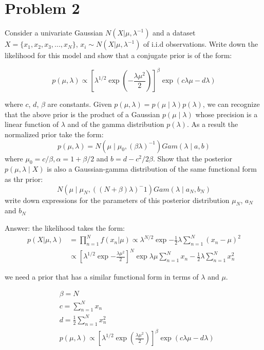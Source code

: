 \documentclass{article}
\begin{document}
\newpage
\section{Problem 2}
Consider a univariate Gaussian $N(X|\mu, \lambda^{-1})$ and a dataset $X = \{x_{1}, x_{2}, x_{3},...,x_{N}\}$, $x_{i}\sim N(X|\mu,\lambda^{-1})$ of i.i.d observations. Write down the likelihood for this model and show that a conjugate prior is of the form:

\begin{equation}
    p(\mu,\lambda)\propto \left[\lambda^{1/2} \exp(-\frac{\lambda \mu^{2}}{2})\right]^{\beta} \exp(c\lambda \mu - d\lambda)
\end{equation}

where $c$, $d$, $\beta$ are constants. Given $p(\mu,\lambda) = p(\mu\mid\lambda) p(\lambda)$, we can recognize that the above prior is the product of a Gaussian $p(\mu\mid\lambda)$ whose precision is a linear function of $\lambda$ and of the gamma distribution $p(\lambda)$. As a result the normalized prior take the form:
\begin{equation}
p(\mu, \lambda) = N \left( \mu\mid \mu_{0},(\beta \lambda)^{-1}\right) Gam(\lambda\mid a,b)  
\end{equation}
where $\mu_{0}=c/\beta, \alpha = 1+\beta/2$ and $b = d-c^2/2\beta$. Show that the posterior $p(\mu, \lambda \mid X)$ is also a Gaussian-gamma distribution of the same functional form as thr prior:
\begin{equation}
    N(\mu \mid \mu_N, ((N+\beta)\lambda)^-1) Gam(\lambda \mid a_N, b_N)
\end{equation}
write down expressions for the parameters of this posterior distribution $\mu_N$, $a_N$ and $b_N$

Answer:
the likelihood takes the form:
\begin{equation}
\begin{aligned}
    p(X|\mu, \lambda) & = \prod_{n=1}^{N} f(x_{n}|\mu) \propto \lambda^{N/2}\exp{-\frac{1}{2}\lambda \sum_{n=1}^N(x_{n}-\mu)^2}\\ & \propto \left[\lambda^{1/2} \exp{-\frac{\lambda \mu^2}{2}}\right]^{N} \exp{\lambda\mu\sum_{n=1}^{N}x_{n}-\frac{1}{2}\lambda\sum_{n=1}^{N}x_{n}^{2}}
\end{aligned}
\end{equation}

we need a prior that has a similar functional form in terms of $\lambda$ and $\mu$.

\begin{equation}
\begin{aligned}
&\beta = N \\
&c = \sum_{n=1}^{N}x_{n} \\
&d = \frac{1}{2}\sum_{n=1}^{N}x_{n}^{2}\\
&p(\mu,\lambda)\propto \left[\lambda^{1/2} \exp(\frac{\lambda \mu^{2}}{2})\right]^{\beta} \exp(c\lambda \mu - d\lambda)
\end{aligned}
\end{equation}
\end{document}
